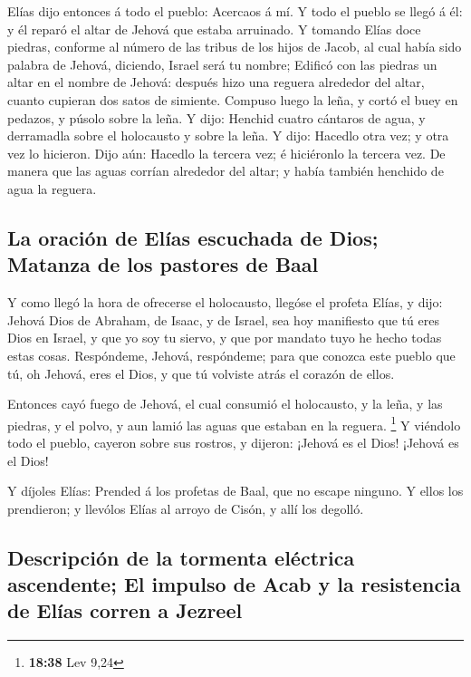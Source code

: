  Elías dijo entonces á todo el pueblo: Acercaos á mí. Y
todo el pueblo se llegó á él: y él reparó el altar de Jehová que estaba
arruinado.  Y tomando Elías doce piedras, conforme al
número de las tribus de los hijos de Jacob, al cual había sido palabra
de Jehová, diciendo, Israel será tu nombre;  Edificó con
las piedras un altar en el nombre de Jehová: después hizo una reguera
alrededor del altar, cuanto cupieran dos satos de simiente.
 Compuso luego la leña, y cortó el buey en pedazos, y
púsolo sobre la leña.  Y dijo: Henchid cuatro cántaros de
agua, y derramadla sobre el holocausto y sobre la leña. Y dijo: Hacedlo
otra vez; y otra vez lo hicieron. Dijo aún: Hacedlo la tercera vez; é
hiciéronlo la tercera vez.  De manera que las aguas
corrían alrededor del altar; y había también henchido de agua la
reguera.

\hypertarget{la-oraciuxf3n-de-eluxedas-escuchada-de-dios-matanza-de-los-pastores-de-baal}{%
\subsection{La oración de Elías escuchada de Dios; Matanza de los
pastores de
Baal}\label{la-oraciuxf3n-de-eluxedas-escuchada-de-dios-matanza-de-los-pastores-de-baal}}

 Y como llegó la hora de ofrecerse el holocausto, llegóse
el profeta Elías, y dijo: Jehová Dios de Abraham, de Isaac, y de Israel,
sea hoy manifiesto que tú eres Dios en Israel, y que yo soy tu siervo, y
que por mandato tuyo he hecho todas estas cosas. 
Respóndeme, Jehová, respóndeme; para que conozca este pueblo que tú, oh
Jehová, eres el Dios, y que tú volviste atrás el corazón de ellos.

 Entonces cayó fuego de Jehová, el cual consumió el
holocausto, y la leña, y las piedras, y el polvo, y aun lamió las aguas
que estaban en la reguera. \footnote{\textbf{18:38} Lev 9,24}
 Y viéndolo todo el pueblo, cayeron sobre sus rostros, y
dijeron: ¡Jehová es el Dios! ¡Jehová es el Dios!

 Y díjoles Elías: Prended á los profetas de Baal, que no
escape ninguno. Y ellos los prendieron; y llevólos Elías al arroyo de
Cisón, y allí los degolló.

\hypertarget{descripciuxf3n-de-la-tormenta-eluxe9ctrica-ascendente-el-impulso-de-acab-y-la-resistencia-de-eluxedas-corren-a-jezreel}{%
\subsection{Descripción de la tormenta eléctrica ascendente; El impulso
de Acab y la resistencia de Elías corren a
Jezreel}\label{descripciuxf3n-de-la-tormenta-eluxe9ctrica-ascendente-el-impulso-de-acab-y-la-resistencia-de-eluxedas-corren-a-jezreel}}


